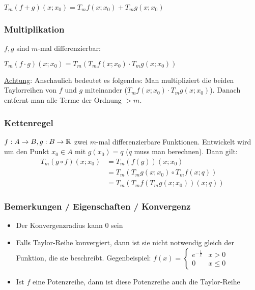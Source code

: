 $T_m (f + g)(x;x_0) = T_m f(x;x_0) + T_m g(x;x_0)$

\subsubsection{Multiplikation}
$f, g$ sind $m$-mal differenzierbar:

$T_m (f \cdot g)(x;x_0) = T_m(T_m f(x;x_0) \cdot T_m g(x;x_0))$

\underline{Achtung}: Anschaulich bedeutet es folgendes: Man
multipliziert die beiden Taylorreihen von $f$ und $g$ miteinander ($T_m f(x;x_0) \cdot T_m g(x;x_0)$).
Danach entfernt man alle Terme der Ordnung $> m$.

\subsubsection{Kettenregel}
$f: A \to B, g: B \to \mathbb{R}$ zwei $m$-mal differenzierbare Funktionen.
Entwickelt wird um den Punkt $x_0 \in A$ mit $g(x_0) = q$ ($q$ muss man berechnen).
Dann gilt:
\begin{align*}
T_m (g \circ f)(x;x_0) &= T_m (f(g))(x;x_0)\\
&= T_m(T_m g(x;x_0) \circ T_m f(x;q))\\
& = T_m(T_m f(T_m g(x;x_0))(x;q))
\end{align*}

\subsubsection{Bemerkungen / Eigenschaften / Konvergenz}
\begin{itemize}
	\item Der Konvergenzradius kann 0 sein
	\item Falls Taylor-Reihe konvergiert, dann ist sie nicht notwendig gleich
	der Funktion, die sie beschreibt. Gegenbeispiel:
	$f(x) = \begin{cases}
	e^{-\frac{1}{x}} & x > 0\\
	0 & x \leq 0\end{cases}$
	\item Ist $f$ eine Potenzreihe, dann ist diese Potenzreihe auch die Taylor-Reihe
\end{itemize}